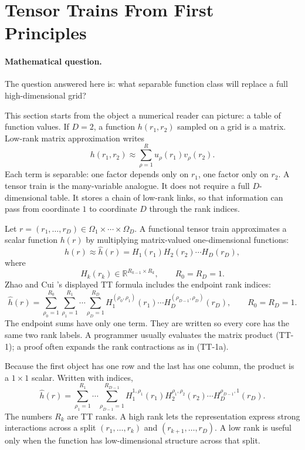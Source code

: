 \documentclass[11pt]{article}
\newcommand{\R}{\mathbb R}
\begin{document}
\section{Tensor Trains From First Principles}

\paragraph{Mathematical question.}
The question answered here is: what separable function class will replace a
full high-dimensional grid?

This section starts from the object a numerical reader can picture: a table of
function values.  If \(D=2\), a function \(h(r_1,r_2)\) sampled on a grid is a
matrix.  Low-rank matrix approximation writes
\[
    h(r_1,r_2)\approx \sum_{\rho=1}^{R} u_\rho(r_1)v_\rho(r_2).
\]
Each term is separable: one factor depends only on \(r_1\), one factor only on
\(r_2\).  A tensor train is the many-variable analogue.  It does not require a
full \(D\)-dimensional table.  It stores a chain of low-rank links, so that
information can pass from coordinate \(1\) to coordinate \(D\) through the rank
indices.

Let \(r=(r_1,\ldots,r_D)\in\Omega_1\times\cdots\times\Omega_D\).  A functional
tensor train approximates a scalar function \(h(r)\) by multiplying
matrix-valued one-dimensional functions:
\[
    h(r)
    \approx
    \widehat h(r)
    =
    H_1(r_1)H_2(r_2)\cdots H_D(r_D),
    \label{eq:p24-tt-1}
\]
where
\[
    H_k(r_k)\in \R^{R_{k-1}\times R_k},\qquad R_0=R_D=1.
\]
Zhao and Cui \cite{zhao2024ttsequential}'s displayed TT formula includes the endpoint rank indices:
\[
    \widehat h(r)
    =
    \sum_{\rho_0=1}^{R_0}\sum_{\rho_1=1}^{R_1}\cdots
    \sum_{\rho_D=1}^{R_D}
    H_1^{(\rho_0,\rho_1)}(r_1)\cdots
    H_D^{(\rho_{D-1},\rho_D)}(r_D),
    \qquad R_0=R_D=1.
    \label{eq:p24-tt-1a}
\]
The endpoint sums have only one term.  They are written so every core has the
same two rank labels.  A programmer usually evaluates the matrix product
(TT-1); a proof often expands the rank contractions as in (TT-1a).

Because the first object has one row and the last has one column, the product is
a \(1\times 1\) scalar.  Written with indices,
\[
    \widehat h(r)
    =
    \sum_{\rho_1=1}^{R_1}\cdots
    \sum_{\rho_{D-1}=1}^{R_{D-1}}
    H_1^{1,\rho_1}(r_1)
    H_2^{\rho_1,\rho_2}(r_2)\cdots
    H_D^{\rho_{D-1},1}(r_D).
    \label{eq:p24-tt-2}
\]
The numbers \(R_k\) are TT ranks.  A high rank lets the representation express
strong interactions across a split \((r_1,\ldots,r_k)\) and
\((r_{k+1},\ldots,r_D)\).  A low rank is useful only when the function has
low-dimensional structure across that split.
\end{document}
